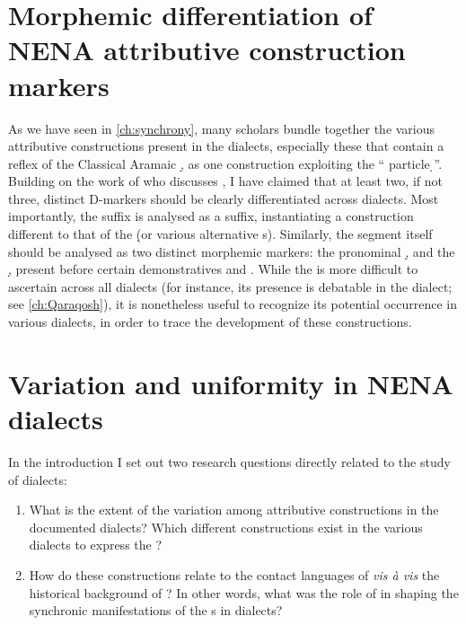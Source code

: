 \section[Morphemic differentiation of NENA AC markers]{Morphemic differentiation of NENA attributive construction markers} \label{ss:morphemic}

As we have seen in \ref{ch:synchrony}, many scholars  bundle together the various attributive constructions present in the  dialects, especially these that contain a reflex of the Classical Aramaic \lnk* \d, as one construction exploiting the \enquote{ particle \d}. Building on the work of \citet{CohenNucleus} who discusses \JZax, I have claimed that at least two, if not three, distinct D-markers should be clearly differentiated across  dialects. Most importantly, the suffix \ed is analysed as a \cst* suffix, instantiating a construction different to that of the \lnk* \d (or various alternative \lnk*s). Similarly,  the  segment itself should be analysed as two distinct morphemic markers: the pronominal \lnk* \d, and the  \d, present before certain demonstratives and . While the  is more difficult to ascertain across all  dialects (for instance, its presence is debatable in the \Qar dialect; see \ref{ch:Qaraqosh}), it is nonetheless useful to recognize its potential occurrence in various  dialects, in order to trace the development of these constructions.


\section{Variation and uniformity in NENA dialects} \label{ss:variation}

In the introduction I set out two research questions directly related to the study of  dialects:

\begin{enumerate}

\item What is the extent of the variation among attributive constructions in the documented  dialects? Which different constructions exist in the various dialects to express the ?

\item How do these constructions relate to the contact languages of  \textit{vis à vis} the historical background of ? In other words, what was the role of  in shaping the synchronic manifestations of the s in  dialects?

\end{enumerate}





